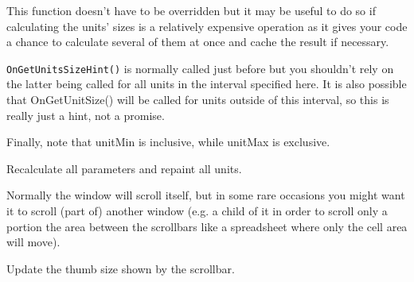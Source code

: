 
This function doesn't have to be overridden but it may be useful to do so if
calculating the units' sizes is a relatively expensive operation as it gives
your code a chance to calculate several of them at once and cache the result
if necessary.

{\tt OnGetUnitsSizeHint()} is normally called just before
 but you
shouldn't rely on the latter being called for all units in the interval
specified here. It is also possible that OnGetUnitSize() will be called for
units outside of this interval, so this is really just a hint, not a promise.

Finally, note that unitMin is inclusive, while unitMax is exclusive.


\label{wxvarscrollhelperbaserefreshall}


Recalculate all parameters and repaint all units.


\label{wxvarscrollhelperbasesettargetwindow}


Normally the window will scroll itself, but in some rare occasions you might
want it to scroll (part of) another window (e.g. a child of it in order to
scroll only a portion the area between the scrollbars like a spreadsheet where
only the cell area will move).




\label{wxvarscrollhelperbaseupdatescrollbar}


Update the thumb size shown by the scrollbar.

